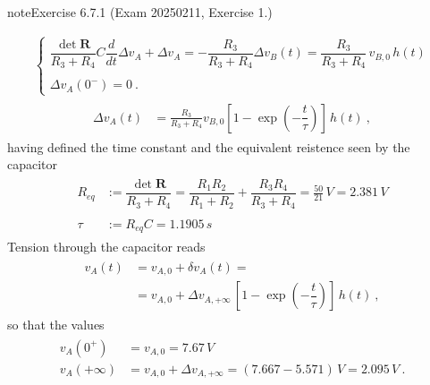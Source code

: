 \documentclass[letterpaper,10pt,english]{jupyterBook}
\begin{document}
\begin{sphinxadmonition}{note}{Exercise 6.7.1 (Exam 2025\sphinxhyphen{}02\sphinxhyphen{}11, Exercise 1.)}
\begin{itemize}
\begin{equation*}
\begin{split}
\begin{cases}
     \dfrac{\det \mathbf{R}}{R_3 + R_4} C  \dfrac{d}{dt}\Delta v_A + \Delta v_{A} = - \dfrac{R_3}{R_3 + R_4} \Delta v_{B}(t) = \dfrac{R_3}{R_3 + R_4} \, v_{B,0} \, h(t) \\ \\
     \Delta v_A(0^-) = 0 \ .
   \end{cases}\end{split}
\end{equation*}\begin{equation*}
\begin{split}\begin{aligned}
     \Delta v_A(t)
     & = \frac{R_3}{R_3 + R_4} v_{B,0} \left[ 1 - \exp\left( - \dfrac{t}{\tau} \right) \right] \, h(t) \ ,
   \end{aligned}\end{split}
\end{equation*}
\sphinxAtStartPar
having defined the time constant and the equivalent reistence seen by the capacitor
\begin{equation*}
\begin{split}\begin{aligned}
     R_{eq} & := \dfrac{\det \mathbf{R}}{R_3+R_4} = \dfrac{R_1 R_2}{R_1 + R_2} + \dfrac{R_3 R_4}{R_3 + R_4} = \frac{50}{21} \, V = 2.381 \, V  \\ \\
     \tau   & := R_{eq} C = 1.1905 \, s 
   \end{aligned}\end{split}
\end{equation*}
\sphinxAtStartPar
Tension through the capacitor reads
\begin{equation*}
\begin{split}\begin{aligned}
     v_A(t) 
     & = v_{A,0} + \delta v_A(t) = \\
     & = v_{A,0} + \Delta v_{A,+\infty} \, \left[ 1 - \exp\left( - \dfrac{t}{\tau} \right) \right] \, h(t) \ , 
   \end{aligned}\end{split}
\end{equation*}
\sphinxAtStartPar
so that the values
\begin{equation*}
\begin{split}\begin{aligned} 
     v_A(0^+)     & = v_{A,0} = 7.67 \, V \\
     v_A(+\infty) & = v_{A,0} + \Delta v_{A,+\infty} = ( 7.667 - 5.571 ) \, V = 2.095 \, V \ .
   \end{aligned}\end{split}

\end{equation*}
\end{itemize}
\end{sphinxadmonition}
\end{document}
